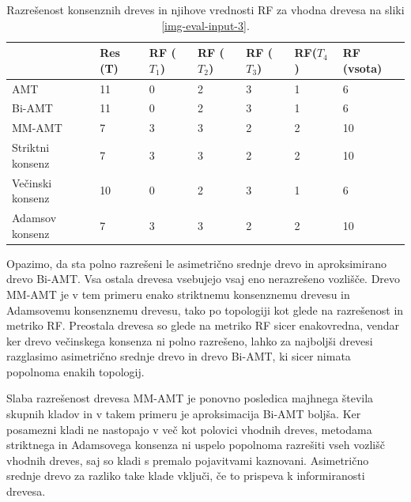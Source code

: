 \documentclass[a4paper, 12pt]{book}
\begin{document}
\begin{table}[h!]
	\begin{center}
	{\footnotesize
	\begin{tabular}{ l| l | l | l | l | l | l }
	~                & Res (T)      & RF ($T_1$) & RF ($T_2$)       & RF ($T_3$) & RF($T_4$) & RF (vsota) \\ \hline
	AMT              & 11          & 0          & 2                & 3          & 1         & 6          \\ \hline
	Bi-AMT           & 11          & 0          & 2                & 3          & 1         & 6          \\ \hline
	MM-AMT           & 7           & 3          & 3                & 2          & 2         & 10         \\ \hline
	Striktni konsenz & 7           & 3          & 3                & 2          & 2         & 10         \\ \hline
	Večinski konsenz & 10          & 0          & 2                & 3          & 1         & 6          \\ \hline
	Adamsov konsenz  & 7           & 3          & 3                & 2          & 2         & 10         \\ \hline
	\end{tabular}
	\caption{\label{table-eval-3}Razrešenost konsenznih dreves in njihove vrednosti RF za vhodna drevesa na sliki \ref{img-eval-input-3}.}
	}
	\end{center}		
\end{table}

Opazimo, da sta polno razrešeni le asimetrično srednje drevo in aproksimirano 
drevo Bi-AMT. Vsa ostala drevesa vsebujejo vsaj eno nerazrešeno vozlišče. 
Drevo MM-AMT je v tem primeru enako striktnemu konsenznemu drevesu in Adamsovemu 
konsenznemu drevesu, tako po topologiji kot glede na razrešenost in metriko RF. 
Preostala drevesa so glede na metriko RF sicer enakovredna, vendar ker drevo 
večinskega konsenza ni polno razrešeno, lahko za najboljši drevesi razglasimo 
asimetrično  srednje drevo in drevo Bi-AMT, ki sicer nimata popolnoma enakih 
topologij.

Slaba razrešenost drevesa MM-AMT je ponovno posledica majhnega števila skupnih
kladov in v takem primeru je aproksimacija Bi-AMT boljša. Ker posamezni kladi 
ne nastopajo v več kot polovici vhodnih dreves, metodama striktnega in Adamsovega 
konsenza ni uspelo popolnoma razrešiti vseh vozlišč vhodnih dreves, saj so kladi 
s premalo pojavitvami kaznovani. Asimetrično srednje drevo za razliko take klade
vključi, če to prispeva k informiranosti drevesa.
\end{document}

